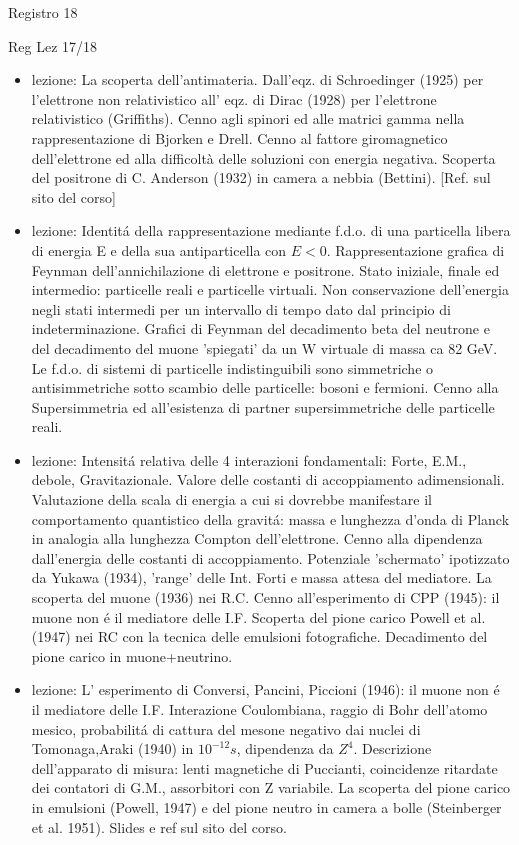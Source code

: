 \begin{frame}{Registro 18}
\begin{frame}[allowframebreaks]{Reg Lez 17/18}
\begin{itemize}
\item lezione: La scoperta dell'antimateria. Dall'eqz. di Schroedinger (1925) per l'elettrone non relativistico all' eqz. di Dirac (1928) per l'elettrone relativistico (Griffiths). Cenno agli spinori ed alle matrici gamma nella rappresentazione di Bjorken e Drell. Cenno al fattore giromagnetico dell'elettrone ed alla difficoltà delle soluzioni con energia negativa. Scoperta del positrone di C. Anderson (1932) in camera a nebbia (Bettini). [Ref. sul sito del corso]

\item lezione: Identit\'a della rappresentazione mediante f.d.o. di una particella libera di energia E e della sua antiparticella con $E<0$. Rappresentazione grafica di Feynman dell'annichilazione di elettrone e positrone. Stato iniziale, finale ed intermedio: particelle reali e particelle virtuali. Non conservazione dell'energia negli stati intermedi per un intervallo di tempo dato dal principio di indeterminazione. Grafici di Feynman del decadimento beta del neutrone e del decadimento del muone 'spiegati' da un W virtuale di massa ca 82 GeV. Le f.d.o. di sistemi di particelle indistinguibili sono simmetriche o antisimmetriche sotto scambio delle particelle: bosoni e fermioni. Cenno alla Supersimmetria ed all'esistenza di partner supersimmetriche delle particelle reali.

\item lezione: Intensit\'a relativa delle 4 interazioni fondamentali: Forte, E.M., debole, Gravitazionale. Valore delle costanti di accoppiamento adimensionali. Valutazione della scala di energia a cui si dovrebbe manifestare il comportamento quantistico della gravit\'a: massa e lunghezza d'onda di Planck in analogia alla lunghezza Compton dell'elettrone. Cenno alla dipendenza dall'energia delle costanti di accoppiamento. Potenziale 'schermato' ipotizzato da Yukawa (1934), 'range' delle Int. Forti e massa attesa del mediatore. La scoperta del muone (1936) nei R.C. Cenno all'esperimento di CPP (1945): il muone non \'e il mediatore delle I.F. Scoperta del pione carico Powell et al. (1947) nei RC con la tecnica delle emulsioni fotografiche. Decadimento del pione carico in muone+neutrino.

\item lezione: L' esperimento di Conversi, Pancini, Piccioni (1946): il muone non \'e il mediatore delle I.F. Interazione Coulombiana, raggio di Bohr dell'atomo mesico, probabilit\'a di cattura del mesone negativo dai nuclei di Tomonaga,Araki (1940) in $10^{-12}s$, dipendenza da $Z^4$. Descrizione dell'apparato di misura: lenti magnetiche di Puccianti, coincidenze ritardate dei contatori di G.M., assorbitori con Z variabile. La scoperta del pione carico in emulsioni (Powell, 1947) e del pione neutro in camera a bolle (Steinberger et al. 1951). Slides e ref sul sito del corso.


\end{itemize}
\end{frame}
\end{frame}
